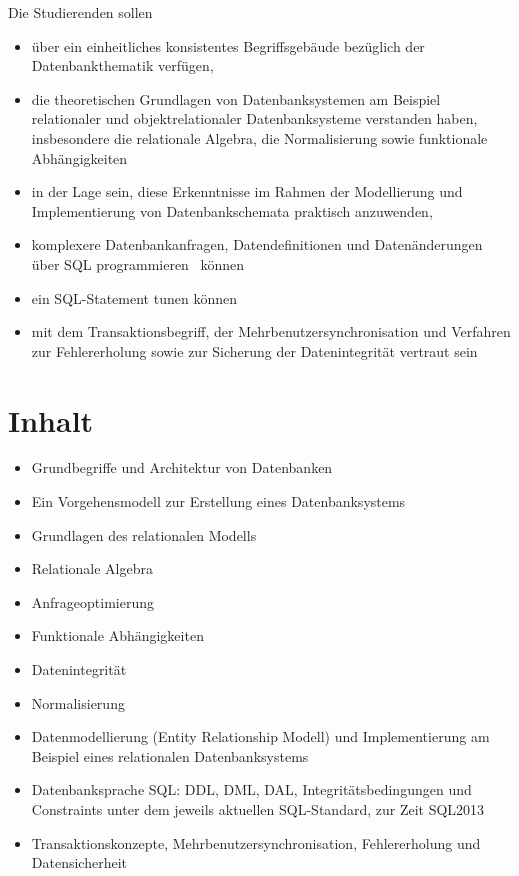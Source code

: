 Die Studierenden sollen

\begin{itemize}
\tightlist
\item
  über ein einheitliches konsistentes Begriffsgebäude bezüglich der
  Datenbankthematik verfügen,
\item
  die theoretischen Grundlagen von Datenbanksystemen am Beispiel
  relationaler und objektrelationaler Datenbanksysteme verstanden haben,
  insbesondere die relationale Algebra, die Normalisierung sowie
  funktionale Abhängigkeiten
\item
  in der Lage sein, diese Erkenntnisse im Rahmen der Modellierung und
  Implementierung von Datenbankschemata praktisch anzuwenden,
\item
  komplexere Datenbankanfragen, Datendefinitionen und Datenänderungen
  über SQL programmieren~ können
\item
  ein SQL-Statement tunen können
\item
  mit dem Transaktionsbegriff, der Mehrbenutzersynchronisation und
  Verfahren zur Fehlererholung sowie zur Sicherung der Datenintegrität
  vertraut sein
\end{itemize}

\section*{Inhalt\label{/mi-2017/modulbeschreibungen-bachelor/BA_Datenbanken1}}\label{inhaltpathlabelmi-2017modulbeschreibungen-bachelorbaux5fdatenbanken1}

\begin{itemize}
\tightlist
\item
  Grundbegriffe und Architektur von Datenbanken
\item
  Ein Vorgehensmodell zur Erstellung eines Datenbanksystems
\item
  Grundlagen des relationalen Modells
\item
  Relationale Algebra
\item
  Anfrageoptimierung
\item
  Funktionale Abhängigkeiten
\item
  Datenintegrität
\item
  Normalisierung
\item
  Datenmodellierung (Entity Relationship Modell) und Implementierung am
  Beispiel eines relationalen Datenbanksystems
\item
  Datenbanksprache SQL: DDL, DML, DAL, Integritätsbedingungen und
  Constraints unter dem jeweils aktuellen SQL-Standard, zur Zeit SQL2013
\item
  Transaktionskonzepte, Mehrbenutzersynchronisation, Fehlererholung und
  Datensicherheit
\end{itemize}


